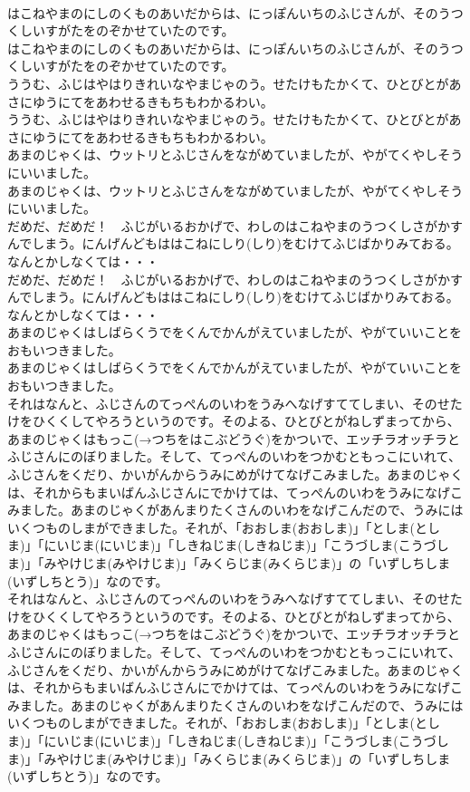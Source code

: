 \documentclass[8pt]{extreport}
\begin{document}
\begin{CJK}{UTF8}{min}
\\	はこねやまのにしのくものあいだからは、にっぽんいちのふじさんが、そのうつくしいすがたをのぞかせていたのです。	
\\	はこねやまのにしのくものあいだからは、にっぽんいちのふじさんが、そのうつくしいすがたをのぞかせていたのです。 
\\	ううむ、ふじはやはりきれいなやまじゃのう。せたけもたかくて、ひとびとがあさにゆうにてをあわせるきもちもわかるわい。	
\\	ううむ、ふじはやはりきれいなやまじゃのう。せたけもたかくて、ひとびとがあさにゆうにてをあわせるきもちもわかるわい。　 
\\	あまのじゃくは、ウットリとふじさんをながめていましたが、やがてくやしそうにいいました。	
\\	あまのじゃくは、ウットリとふじさんをながめていましたが、やがてくやしそうにいいました。 
\\	だめだ、だめだ！　ふじがいるおかげで、わしのはこねやまのうつくしさがかすんでしまう。にんげんどもははこねにしり(しり)をむけてふじばかりみておる。なんとかしなくては・・・	
\\	だめだ、だめだ！　ふじがいるおかげで、わしのはこねやまのうつくしさがかすんでしまう。にんげんどもははこねにしり(しり)をむけてふじばかりみておる。なんとかしなくては・・・ 
\\	あまのじゃくはしばらくうでをくんでかんがえていましたが、やがていいことをおもいつきました。	
\\	あまのじゃくはしばらくうでをくんでかんがえていましたが、やがていいことをおもいつきました。 
\\	それはなんと、ふじさんのてっぺんのいわをうみへなげすててしまい、そのせたけをひくくしてやろうというのです。そのよる、ひとびとがねしずまってから、あまのじゃくはもっこ(→つちをはこぶどうぐ)をかついで、エッチラオッチラとふじさんにのぼりました。そして、てっぺんのいわをつかむともっこにいれて、ふじさんをくだり、かいがんからうみにめがけてなげこみました。あまのじゃくは、それからもまいばんふじさんにでかけては、てっぺんのいわをうみになげこみました。あまのじゃくがあんまりたくさんのいわをなげこんだので、うみにはいくつものしまができました。それが、「おおしま(おおしま)」「としま(としま)」「にいじま(にいじま)」「しきねじま(しきねじま)」「こうづしま(こうづしま)」「みやけじま(みやけじま)」「みくらじま(みくらじま)」の「いずしちしま(いずしちとう)」なのです。	
\\	それはなんと、ふじさんのてっぺんのいわをうみへなげすててしまい、そのせたけをひくくしてやろうというのです。そのよる、ひとびとがねしずまってから、あまのじゃくはもっこ(→つちをはこぶどうぐ)をかついで、エッチラオッチラとふじさんにのぼりました。そして、てっぺんのいわをつかむともっこにいれて、ふじさんをくだり、かいがんからうみにめがけてなげこみました。あまのじゃくは、それからもまいばんふじさんにでかけては、てっぺんのいわをうみになげこみました。あまのじゃくがあんまりたくさんのいわをなげこんだので、うみにはいくつものしまができました。それが、「おおしま(おおしま)」「としま(としま)」「にいじま(にいじま)」「しきねじま(しきねじま)」「こうづしま(こうづしま)」「みやけじま(みやけじま)」「みくらじま(みくらじま)」の「いずしちしま(いずしちとう)」なのです。 

\end{CJK}
\end{document}
